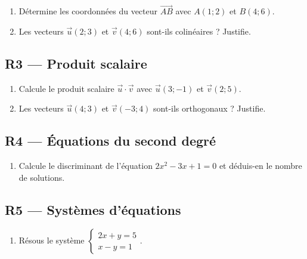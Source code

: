 \begin{enumerate}[resume]

  \item Détermine les coordonnées du vecteur $\vec{AB}$ avec $A(1 ; 2)$ et $B(4 ; 6)$.

  \item Les vecteurs $\vec{u}(2 ; 3)$ et $\vec{v}(4 ; 6)$ sont-ils colinéaires ? Justifie.

\end{enumerate}

\subsection*{R3 — Produit scalaire}

\begin{enumerate}[resume]

  \item Calcule le produit scalaire $\vec{u} \cdot \vec{v}$ avec $\vec{u}(3 ; -1)$ et $\vec{v}(2 ; 5)$.

  \item Les vecteurs $\vec{u}(4 ; 3)$ et $\vec{v}(-3 ; 4)$ sont-ils orthogonaux ? Justifie.

\end{enumerate}

\subsection*{R4 — Équations du second degré}

\begin{enumerate}[resume]

  \item Calcule le discriminant de l'équation $2x^2 - 3x + 1 = 0$ et déduis-en le nombre de solutions.

\end{enumerate}

\subsection*{R5 — Systèmes d'équations}

\begin{enumerate}[resume]

  \item Résous le système $\begin{cases} 2x + y = 5 \\ x - y = 1 \end{cases}$.

\end{enumerate}

